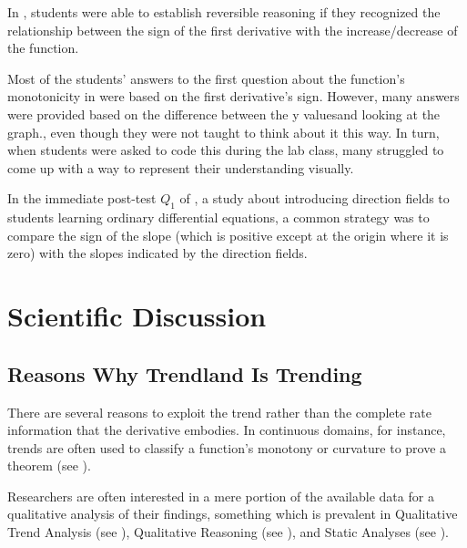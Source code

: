 \documentclass[11pt]{book}
\begin{document}
In \cite{ikram2020mathematical}, students were able to establish reversible
reasoning if they recognized the relationship between the sign of
the first derivative with the increase/decrease of the function.

Most of the students' answers to the first question about the function's
monotonicity in \cite{ishibashi2020effect} were based on the first
derivative's sign. However, many answers were provided based on \textquotedbl the
difference between the y values\textquotedbl and \textquotedbl looking
at the graph.\textquotedbl, even though they were not taught
to think about it this way. In turn, when students were asked to code
this during the lab class, many struggled to come up with a way to
represent their understanding visually.

In the immediate post-test $Q_{1}$ of \cite{hyland2021introducing}, a study about introducing direction fields to
students learning ordinary differential equations,
a common strategy was to compare the sign of the slope (which is positive
except at the origin where it is zero) with the slopes indicated by
the direction fields.\newpage{}


\part{Scientific Discussion}

\label{scientific_discussion_part} 

\chapter{Reasons Why Trendland Is Trending}

There are several reasons to exploit the trend rather than the complete
rate information that the derivative embodies. In continuous domains, for instance, trends are often used to classify a function's monotony or curvature to prove a theorem
(see \cite{bebbington2012discrete,berman2013predation,kazez2015approximating,bengui2018macroprudential,gabszewicz2018random,de2019strategic,fowl2021preventing}).

Researchers are often interested in a mere portion of the available
data for a qualitative analysis of their findings, something which is
prevalent in Qualitative Trend Analysis (see \cite{dash2003fuzzy,dash2004novel,maurya2007signed,maurya2010framework,villez2013generalized,villez2014qualitative,thurlimannqualitative,villez2016shape,thurlimann2018soft}),
Qualitative Reasoning (see \cite{cerbah1992integrating,tiwari2002series,carriquiry2007reputations,ivanjek2016student,ikram2020mathematical}),
and Static Analyses (see \cite{lanaspa2001public,carr2007stochastic,carriquiry2007reputations,kacperczyk2009rational,haucap2012regulation,thoni2015peer,thwaites2015real,chirinko2017tax,tavani2017endogenous,skott2017weaknesses,impullitti2018trade,augustin2018term,loffler2018pitfalls,bardgett2019inferring}).
\end{document}
